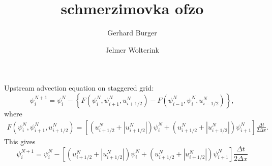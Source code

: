 \documentclass[12pt, a4paper]{article}
\author{Gerhard Burger \and Jelmer Wolterink}
\title{schmerzimovka ofzo}
\newcommand{\abs}[1]{\left\lvert#1\right\rvert}
\begin{document}
\maketitle

Upstream advection equation on staggered grid:
\begin{equation}
 \psi_i^{N+1} = \psi_i^N - \left\{ F \left( \psi_i^N,\psi_{i+1}^N,u_{i+1/2}^N\right) 
-F \left( \psi_{i-1}^N,\psi_{i}^N,u_{i-1/2}^N\right) \right\},
\end{equation}
where
\begin{multline}
F \left( \psi_i^N,\psi_{i+1}^N,u_{i+1/2}^N\right) = 
\left[ \left( u_{i+1/2}^N + \abs{u_{i+1/2}^N} \right) \psi_i^N 
+ \left( u_{i+1/2}^N + \abs{u_{i+1/2}^N} \right) \psi_{i+1}^N \right]
\frac{\Delta t}{2 \Delta x}.
\end{multline}
This gives
\begin{equation}
\psi_i^{N+1} = \psi_i^N - \left[ \left( u_{i+1/2}^N + \abs{u_{i+1/2}^N} \right) \psi_i^N 
+ \left( u_{i+1/2}^N + \abs{u_{i+1/2}^N} \right) \psi_{i+1}^N \right]
\frac{\Delta t}{2 \Delta x}
\end{equation}
\end{document}
